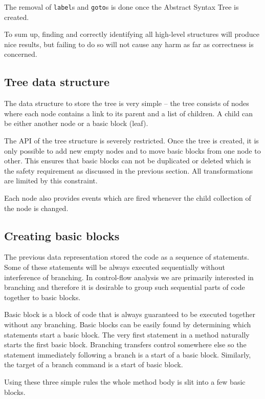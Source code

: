 \documentclass[12pt,twoside,notitlepage]{report}
\begin{document}
The removal of \verb|label|s and \verb|goto|s is done once
the Abstract Syntax Tree is created.

To sum up, finding and correctly identifying all high-level
structures will produce nice results, but failing to
do so will not cause any harm as far as correctness is concerned.


\subsection{Tree data structure}

The data structure to store the tree is very simple -- 
the tree consists of nodes where each node contains a link
to its parent and a list of children.  A child can be either
another node or a basic block (leaf).

The API of the tree structure is severely restricted.
Once the tree is created, it is only possible to add new empty 
nodes and to move basic blocks from one node to other.
This ensures that basic blocks can not be duplicated or
deleted which is the safety requirement as discussed in the
previous section.
All transformations are limited by this constraint.

Each node also provides events which are fired whenever
the child collection of the node is changed.

\subsection{Creating basic blocks}

The previous data representation stored the code as a sequence 
of statements.  Some of these statements will be always
executed sequentially without interference of branching.
In control-flow analysis we are primarily interested in
branching and therefore it is desirable to group such
sequential parts of code together to basic blocks.

Basic block is a block of code that is always guaranteed to
be executed together without any branching.  Basic blocks
can be easily found by determining which statements start
a basic block.  The very first statement in a method 
naturally starts the first basic block.  Branching transfers
control somewhere else so the statement immediately following
a branch is a start of a basic block.
Similarly, the target of a branch command is a start of
basic block.

Using these three simple rules the whole method body
is slit into a few basic blocks.
\end{document}
